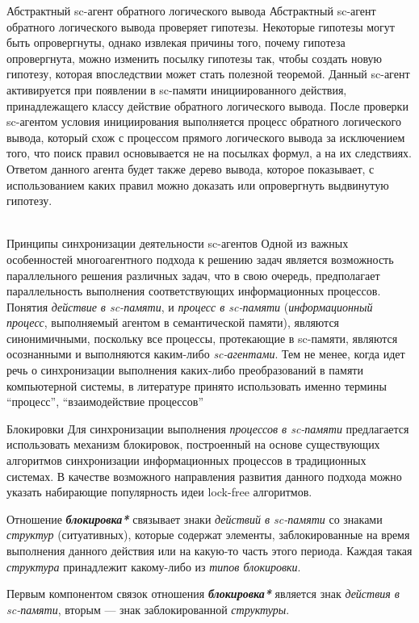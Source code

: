 \begin{frame}{\Large Абстрактный sc-агент обратного логического вывода}
\vspace{8mm}
  Абстрактный sc-агент обратного логического вывода проверяет гипотезы. Некоторые гипотезы могут быть опровергнуты, однако извлекая причины того, почему гипотеза опровергнута, можно изменить посылку гипотезы так, чтобы создать новую гипотезу, которая впоследствии может стать полезной теоремой. Данный sc-агент активируется при появлении в sc-памяти инициированного действия, принадлежащего классу действие обратного логического вывода. После проверки sc-агентом условия инициирования выполняется процесс обратного логического вывода, который схож с процессом прямого логического вывода за исключением того, что поиск правил основывается не на посылках формул, а на их следствиях. Ответом данного агента будет также дерево вывода, которое показывает, с использованием каких правил можно доказать или опровергнуть выдвинутую гипотезу. 
\end{frame}

\begin{frame}{\\Принципы синхронизации деятельности sc-агентов}
        Одной из важных особенностей многоагентного подхода к решению задач является возможность параллельного решения различных задач, что в свою очередь, предполагает параллельность выполнения соответствующих информационных процессов.
        Понятия \textit{действие в sc-памяти}, и \textit{процесс в sc-памяти} (\textit{информационный процесс}, выполняемый агентом в семантической памяти), являются синонимичными, поскольку все процессы, протекающие в sc-памяти, являются осознанными и выполняются каким-либо \textit{sc-агентами}. Тем не менее, когда идет речь о синхронизации выполнения каких-либо преобразований в памяти компьютерной системы, в литературе принято использовать именно термины ``процесс'', ``взаимодействие процессов''
\end{frame}

\begin{frame}{Блокировки}
Для синхронизации выполнения \textit{процессов в sc-памяти} предлагается использовать механизм блокировок, построенный на основе существующих алгоритмов синхронизации информационных процессов в традиционных системах. В качестве возможного направления развития данного подхода можно указать набирающие популярность идеи lock-free алгоритмов.

Отношение \textbf{\textit{блокировка*}} связывает знаки \textit{действий в sc-памяти} со знаками \textit{структур} (ситуативных), которые содержат элементы, заблокированные на время выполнения данного действия или на какую-то часть этого периода. Каждая такая \textit{структура} принадлежит какому-либо из \textit{типов блокировки}.

Первым компонентом связок отношения \textbf{\textit{блокировка*}} является знак \textit{действия в sc-памяти}, вторым --- знак заблокированной \textit{структуры}.
\end{frame}

